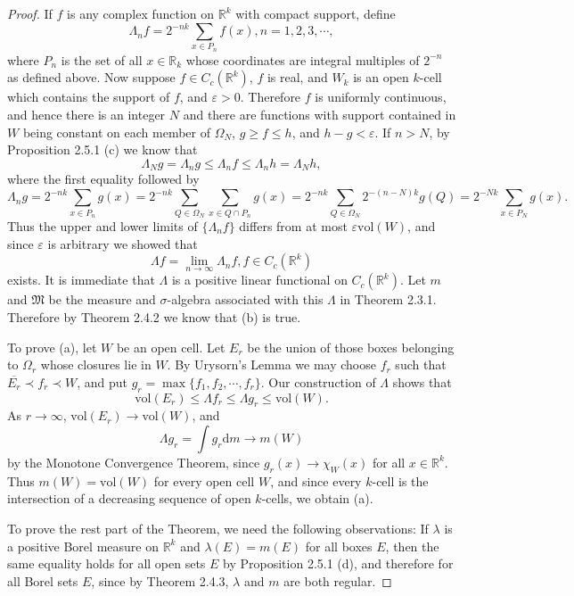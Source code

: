 \begin{proof}
If $f$ is any complex function on $\mathbb{R}^k$ with compact support, define 
$$\Lambda_nf=2^{-nk}\sum_{x\in P_n}f(x),n=1,2,3,\cdots,$$
where $P_n$ is the set of all $x\in\mathbb{R}_k$ whose coordinates are integral multiples of $2^{-n}$ as defined above. Now suppose $f\in C_c(\mathbb{R}^k)$, $f$ is real, and $W_k$ is an open $k$-cell which contains the support of $f$, and $\varepsilon>0$. Therefore $f$ is uniformly continuous, and hence there is an integer $N$ and there are functions with support contained in $W$ being constant on each member of $\Omega_N$, $g\ge f\le h$, and $h-g<\varepsilon$. If $n>N$, by Proposition 2.5.1 (c) we know that 
$$
\Lambda _Ng=\Lambda _ng\le \Lambda _nf\le \Lambda _nh=\Lambda _Nh,
$$
where the first equality followed by 
$$
\Lambda _ng=2^{-nk}\sum_{x\in P_n}{g\left( x \right)}=2^{-nk}\sum_{Q\in \Omega _N}{\sum_{x\in Q\cap P_n}{g\left( x \right)}}=2^{-nk}\sum_{Q\in \Omega _N}{2^{-\left( n-N \right) k}g\left( Q \right)}=2^{-Nk}\sum_{x\in P_N}{g\left( x \right)}.
$$
Thus the upper and lower limits of $\{\Lambda_nf\}$ differs from at most $\varepsilon\mathrm{vol}(W)$, and since $\varepsilon$ is arbitrary we showed that $$\Lambda f=\lim_{n\to\infty}\Lambda_nf,f\in C_c(\mathbb{R}^k)$$
exists. It is immediate that $\Lambda$  is a positive linear functional on $C_c(\mathbb{R}^k)$. Let $m$ and $\mathfrak{M}$ be the measure and $\sigma$-algebra associated with this $\Lambda$ in Theorem 2.3.1. Therefore by Theorem 2.4.2 we know that (b) is true.\par
To prove (a), let $W$ be an open cell. Let $E_r$ be the union of those boxes belonging to $\Omega_r$ whose closures lie in $W$. By Urysorn's Lemma we may choose $f_r$ such that $\overline{E_r}\prec f_r\prec W$, and put $g_r=\max\{f_1,f_2,\cdots,f_r\}$. Our construction of $\Lambda$ shows that 
$$\mathrm{vol}(E_r)\le\Lambda f_r\le\Lambda g_r\le\mathrm{vol}(W).$$
As $r\to\infty$, $\mathrm{vol}(E_r)\to\mathrm{vol}(W)$, and 
$$\Lambda g_r=\int g_r\mathrm{d}m\to m(W)$$
by the Monotone Convergence Theorem, since $g_r(x)\to\chi_W(x)$ for all $x\in\mathbb{R}^k$. Thus $m(W)=\mathrm{vol}(W)$ for every open cell $W$, and since every $k$-cell is the intersection of a decreasing sequence of open $k$-cells, we obtain (a).\par
To prove the rest part of the Theorem, we need the following observations: If $\lambda$ is a positive Borel measure on $\mathbb{R}^k$ and $\lambda(E)=m(E)$ for all boxes $E$, then the same equality holds for all open sets $E$ by Proposition 2.5.1 (d), and therefore for all Borel sets $E$, since by Theorem 2.4.3, $\lambda$ and $m$ are both regular.\par

\end{proof}
